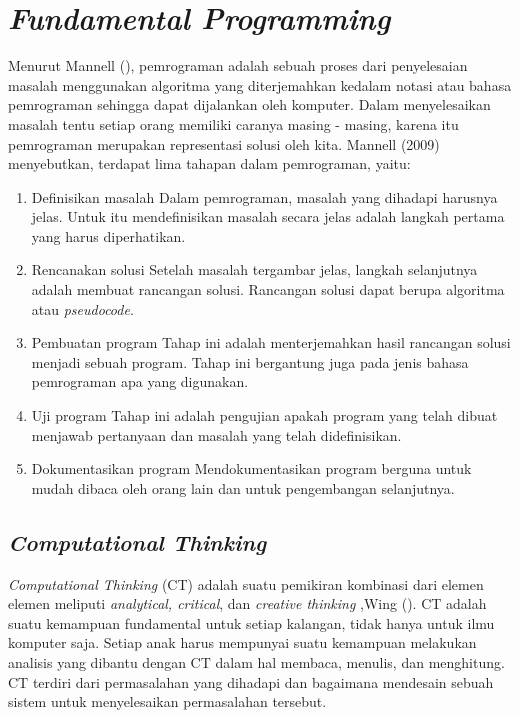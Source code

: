 \section{\textit{Fundamental Programming}}
	Menurut Mannell (\citeyear{paper.mannell}), pemrograman adalah sebuah proses dari penyelesaian masalah menggunakan algoritma yang diterjemahkan kedalam notasi atau bahasa pemrograman sehingga dapat dijalankan oleh komputer. Dalam menyelesaikan masalah tentu setiap orang memiliki caranya masing - masing, karena itu pemrograman merupakan representasi solusi oleh kita.
	\linebreak\linebreak
	Mannell (2009) menyebutkan, terdapat lima tahapan dalam pemrograman, yaitu:
	\begin{enumerate}
		\item Definisikan masalah
			\subitem Dalam pemrograman, masalah yang dihadapi harusnya jelas. Untuk itu mendefinisikan masalah secara jelas adalah langkah pertama yang harus diperhatikan.
		\item Rencanakan solusi
			\subitem Setelah masalah tergambar jelas, langkah selanjutnya adalah membuat rancangan solusi. Rancangan solusi dapat berupa algoritma atau \textit{pseudocode}.
		\item Pembuatan program
			\subitem Tahap ini adalah menterjemahkan hasil rancangan solusi menjadi sebuah program. Tahap ini bergantung juga pada jenis bahasa pemrograman apa yang digunakan.
		\item Uji program
			\subitem Tahap ini adalah pengujian apakah program yang telah dibuat menjawab pertanyaan dan masalah yang telah didefinisikan.
		\item Dokumentasikan program
			\subitem Mendokumentasikan program berguna untuk mudah dibaca oleh orang lain dan untuk pengembangan selanjutnya.
	\end{enumerate}
	\subsection{\textit{Computational Thinking}}
	\textit{Computational Thinking} (CT) adalah suatu pemikiran kombinasi dari elemen elemen meliputi \textit{analytical, critical}, dan \textit{creative thinking} ,Wing (\citeyear{paper.wing}).  CT adalah suatu kemampuan fundamental untuk setiap kalangan, tidak hanya untuk ilmu komputer saja. Setiap anak harus mempunyai suatu kemampuan melakukan analisis yang dibantu dengan CT dalam hal membaca, menulis, dan menghitung. CT terdiri dari permasalahan yang dihadapi dan bagaimana mendesain sebuah sistem untuk menyelesaikan permasalahan tersebut.
